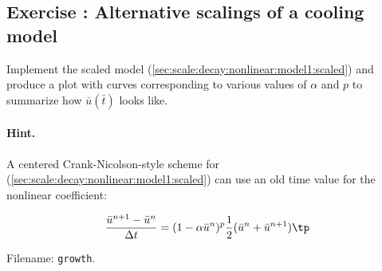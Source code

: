 \documentclass[graybox,envcountchap,sectrefs,final]{svmonodo}
\newenvironment{doconceexercise}{}{}
\newcounter{doconceexercisecounter}
\begin{document}
\begin{doconceexercise}

\subsection*{Exercise \thedoconceexercisecounter: Alternative scalings of a cooling model}

\label{scale:decay:exer:nonlin:logistic2}

Implement the scaled model (\ref{sec:scale:decay:nonlinear:model1:scaled})
and produce a plot with curves corresponding to various values of
$\alpha$ and $p$ to summarize how $\bar u(\bar t)$ looks like.


\paragraph{Hint.}
A centered Crank-Nicolson-style
scheme for (\ref{sec:scale:decay:nonlinear:model1:scaled})
can use an old time value for the nonlinear coefficient:

\[ \frac{\bar u^{n+1} - \bar u^n}{\Delta t} =
(1 - \alpha\bar u^n)^p\frac{1}{2}(\bar u^n + \bar u^{n+1})\tp\]

\noindent Filename: \texttt{growth}.

\end{doconceexercise}
\end{document}
